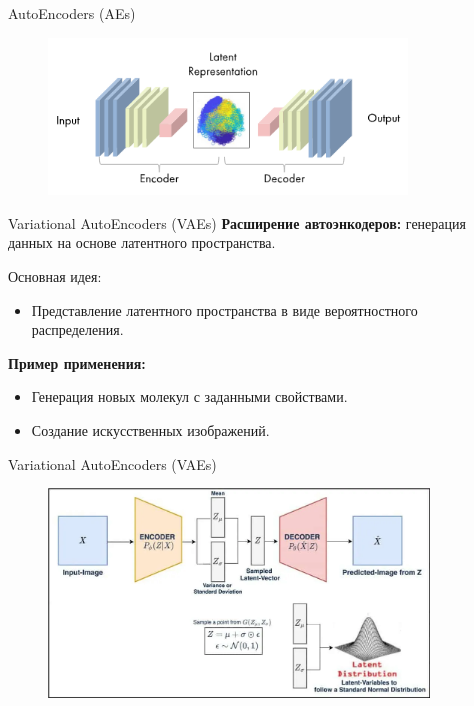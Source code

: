 \begin{frame}{AutoEncoders (AEs)}
    \begin{figure}
        \centering
        \includegraphics[width=0.85\textwidth]{../resources/methods/autoencoder.png}
    \end{figure}
\end{frame}

\begin{frame}{Variational AutoEncoders (VAEs)}
    \textbf{Расширение автоэнкодеров:} генерация данных на основе латентного пространства.

    Основная идея:
    \begin{itemize}
        \item Представление латентного пространства в виде вероятностного распределения.
    \end{itemize}

    \textbf{Пример применения:}
    \begin{itemize}
        \item Генерация новых молекул с заданными свойствами.
        \item Создание искусственных изображений.
    \end{itemize}
\end{frame}

\begin{frame}{Variational AutoEncoders (VAEs)}
    \begin{figure}
        \centering
        \includegraphics[width=0.9\textwidth]{../resources/methods/vae.png}
    \end{figure}
\end{frame}

